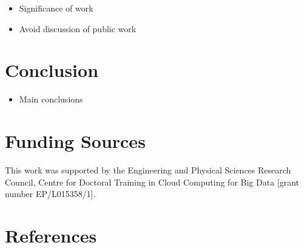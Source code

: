 \documentclass[final,3p,times,twocolumn,numbers]{elsarticle}
\begin{document}
\begin{itemize}
	\item Significance of work
	\item Avoid discussion of public work
\end{itemize}

\section{Conclusion}
\label{sec:conclusion}

\begin{itemize}
	\item Main conclusions
\end{itemize}

\section{Funding Sources}

This work was supported by the Engineering and Physical Sciences Research Council, Centre for Doctoral Training in Cloud Computing for Big Data [grant number EP/L015358/1].






   
  \section*{References}
  


%
%
%
\end{document}
